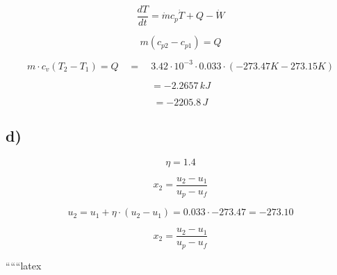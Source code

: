\begin{equation*}
\frac{dT}{dt} = \dot{m} c_{p} \dot{T} + Q - \dot{W}
\end{equation*}

\begin{equation*}
m(c_{p2} - c_{p1}) = Q
\end{equation*}

\begin{equation*}
m \cdot c_{v} (T_2 - T_1) = Q \quad = \quad 3.42 \cdot 10^{-3} \cdot 0.033 \cdot (-273.47 K - 273.15 K)
\end{equation*}

\begin{equation*}
= -2.2657 \, kJ
\end{equation*}

\begin{equation*}
= -2205.8 \, J
\end{equation*}

\subsection*{d)}

\begin{equation*}
\eta = 1.4
\end{equation*}

\begin{equation*}
x_2 = \frac{u_2 - u_1}{u_p - u_f}
\end{equation*}

\begin{equation*}
u_2 = u_1 + \eta \cdot (u_2 - u_1) = 0.033 \cdot -273.47 = -273.10
\end{equation*}

\begin{equation*}
x_2 = \frac{u_2 - u_1}{u_p - u_f}
\end{equation*}

``````latex


